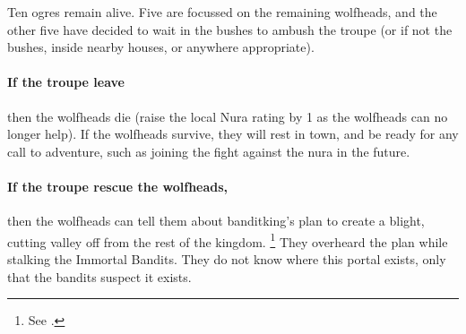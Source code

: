 Ten ogres remain alive.
Five are focussed on the remaining \glspl{wolfhead}, and the other five have decided to wait in the bushes to ambush the troupe (or if not the bushes, inside nearby houses, or anywhere appropriate).

\paragraph{If the troupe leave}
then the \glspl{wolfhead} die (raise the local Nura rating by 1 as the \glspl{wolfhead} can no longer help).
If the \glspl{wolfhead} survive, they will rest in \gls{town}, and be ready for any call to adventure, such as joining the fight against the nura in the future.

\paragraph{If the troupe rescue the \glspl{wolfhead},}
then the \glspl{wolfhead} can tell them about \gls{banditking}'s plan to create a blight, cutting \gls{valley} off from the rest of the kingdom.%
\footnote{See .}
They overheard the plan while stalking the Immortal Bandits.
They do not know where this portal exists, only that the bandits suspect it exists.



\stopcontents[sq]

